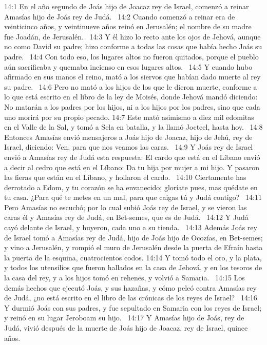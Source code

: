 14:1 En el año segundo de Joás hijo de Joacaz rey de Israel, comenzó a reinar Amasías hijo de Joás rey de Judá.  
14:2 Cuando comenzó a reinar era de veinticinco años, y veintinueve años reinó en Jerusalén; el nombre de su madre fue Joadán, de Jerusalén.  
14:3 Y él hizo lo recto ante los ojos de Jehová, aunque no como David su padre; hizo conforme a todas las cosas que había hecho Joás su padre.  
14:4 Con todo eso, los lugares altos no fueron quitados, porque el pueblo aún sacrificaba y quemaba incienso en esos lugares altos.  
14:5 Y cuando hubo afirmado en sus manos el reino, mató a los siervos que habían dado muerte al rey su padre.  
14:6 Pero no mató a los hijos de los que le dieron muerte, conforme a lo que está escrito en el libro de la ley de Moisés, donde Jehová mandó diciendo: No matarán a los padres por los hijos, ni a los hijos por los padres, sino que cada uno morirá por su propio pecado. 
14:7 Este mató asimismo a diez mil edomitas en el Valle de la Sal, y tomó a Sela en batalla, y la llamó Jocteel, hasta hoy.  
14:8 Entonces Amasías envió mensajeros a Joás hijo de Joacaz, hijo de Jehú, rey de Israel, diciendo: Ven, para que nos veamos las caras.  
14:9 Y Joás rey de Israel envió a Amasías rey de Judá esta respuesta: El cardo que está en el Líbano envió a decir al cedro que está en el Líbano: Da tu hija por mujer a mi hijo. Y pasaron las fieras que están en el Líbano, y hollaron el cardo.  
14:10 Ciertamente has derrotado a Edom, y tu corazón se ha envanecido; gloríate pues, mas quédate en tu casa. ¿Para qué te metes en un mal, para que caigas tú y Judá contigo?  
14:11 Pero Amasías no escuchó; por lo cual subió Joás rey de Israel, y se vieron las caras él y Amasías rey de Judá, en Bet-semes, que es de Judá.  
14:12 Y Judá cayó delante de Israel, y huyeron, cada uno a su tienda.  
14:13 Además Joás rey de Israel tomó a Amasías rey de Judá, hijo de Joás hijo de Ocozías, en Bet-semes; y vino a Jerusalén, y rompió el muro de Jerusalén desde la puerta de Efraín hasta la puerta de la esquina, cuatrocientos codos. 
14:14 Y tomó todo el oro, y la plata, y todos los utensilios que fueron hallados en la casa de Jehová, y en los tesoros de la casa del rey, y a los hijos tomó en rehenes, y volvió a Samaria.  
14:15 Los demás hechos que ejecutó Joás, y sus hazañas, y cómo peleó contra Amasías rey de Judá, ¿no está escrito en el libro de las crónicas de los reyes de Israel?  
14:16 Y durmió Joás con sus padres, y fue sepultado en Samaria con los reyes de Israel; y reinó en su lugar Jeroboam su hijo.  
14:17 Y Amasías hijo de Joás, rey de Judá, vivió después de la muerte de Joás hijo de Joacaz, rey de Israel, quince años.  
